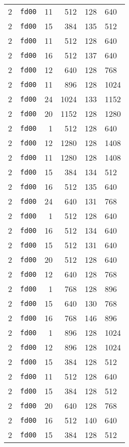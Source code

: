 \documentclass{article}
\begin{document}
\begin{table}[h!]
\begin{tabular}{llrrrl}
    2 & \texttt{fd00} & 11 & 512 & 128 & 640 \\
    2 & \texttt{fd00} & 15 & 384 & 135 & 512 \\
    2 & \texttt{fd00} & 11 & 512 & 128 & 640 \\
    2 & \texttt{fd00} & 16 & 512 & 137 & 640 \\
    2 & \texttt{fd00} & 12 & 640 & 128 & 768 \\
    2 & \texttt{fd00} & 11 & 896 & 128 & 1024 \\
    2 & \texttt{fd00} & 24 & 1024 & 133 & 1152 \\
    2 & \texttt{fd00} & 20 & 1152 & 128 & 1280 \\
    2 & \texttt{fd00} & 1 & 512 & 128 & 640 \\
    2 & \texttt{fd00} & 12 & 1280 & 128 & 1408 \\
    2 & \texttt{fd00} & 11 & 1280 & 128 & 1408 \\
    2 & \texttt{fd00} & 15 & 384 & 134 & 512 \\
    2 & \texttt{fd00} & 16 & 512 & 135 & 640 \\
    2 & \texttt{fd00} & 24 & 640 & 131 & 768 \\
    2 & \texttt{fd00} & 1 & 512 & 128 & 640 \\
    2 & \texttt{fd00} & 16 & 512 & 134 & 640 \\
    2 & \texttt{fd00} & 15 & 512 & 131 & 640 \\
    2 & \texttt{fd00} & 20 & 512 & 128 & 640 \\
    2 & \texttt{fd00} & 12 & 640 & 128 & 768 \\
    2 & \texttt{fd00} & 1 & 768 & 128 & 896 \\
    2 & \texttt{fd00} & 15 & 640 & 130 & 768 \\
    2 & \texttt{fd00} & 16 & 768 & 146 & 896 \\
    2 & \texttt{fd00} & 1 & 896 & 128 & 1024 \\
    2 & \texttt{fd00} & 12 & 896 & 128 & 1024 \\
    2 & \texttt{fd00} & 15 & 384 & 128 & 512 \\
    2 & \texttt{fd00} & 11 & 512 & 128 & 640 \\
    2 & \texttt{fd00} & 15 & 384 & 128 & 512 \\
    2 & \texttt{fd00} & 20 & 640 & 128 & 768 \\
    2 & \texttt{fd00} & 16 & 512 & 140 & 640 \\
    2 & \texttt{fd00} & 15 & 384 & 128 & 512 \\

\end{tabular}
\end{table}
\end{document}
